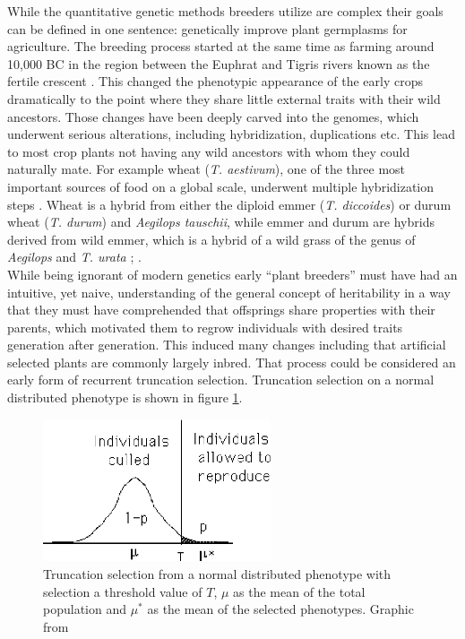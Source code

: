 While the quantitative genetic methods breeders utilize are complex their goals can be
defined in one sentence: genetically improve plant germplasms for agriculture. The
breeding process started at the same time as farming around 10,000 BC in the region
between the Euphrat and Tigris rivers known as the fertile crescent
\cite{kingsbury2009hybrid}. This changed the phenotypic appearance of the early crops
dramatically to the point where they share little external traits with their wild
ancestors. Those changes have been deeply carved into the genomes, which underwent serious
alterations, including hybridization, duplications etc. This lead to most crop plants not
having any wild ancestors with whom they could naturally mate. For example wheat
(\textit{T. aestivum}), one of the three most important sources of food on a global
scale, underwent multiple hybridization steps \cite{ozkan2001allopolyploidy}. Wheat is a
hybrid from either the diploid emmer (\textit{T. diccoides}) or durum wheat
(\textit{T. durum}) and \textit{{Aegilops tauschii}}, while emmer and durum are hybrids
derived from wild emmer, which is a hybrid of a wild grass of the genus of \textit{Aegilops}
and \textit{T. urata} \cite{friebe2000development}; \cite{feldman2012genome}.\\
While being ignorant of modern genetics early ``plant breeders'' must have had an
intuitive, yet naive, understanding of the general concept of heritability in a way that
they must have comprehended that offsprings share properties with their parents, which
motivated them to regrow individuals with desired traits generation after
generation. This induced many changes including that artificial selected plants are
commonly largely inbred. That process could be considered an early form of recurrent
truncation selection. Truncation selection on a normal distributed phenotype is shown in
figure \ref{fig:trunSel}.
 
\begin{figure}[H]
  \centering \includegraphics[height=.25\textheight, width=0.6\textwidth]{Figures/truncSel} \decoRule
  \caption[Truncation selection of a normal distributed phenotype]{Truncation selection
    from a normal distributed phenotype with selection a threshold value of $T$, $\mu$ as
    the mean of the total population and $\mu^{\ast}$ as the mean of the selected
    phenotypes. Graphic from \cite{walsh2018short}}
 \label{fig:trunSel}
\end{figure}

